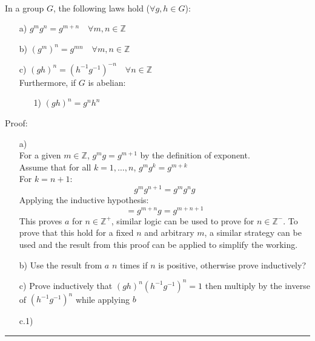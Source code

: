 \documentclass[11pt]{article}
\begin{document}
\begin{solution} \hfill \\
In a group $G$, the following laws hold ($\forall g,h\in G$):
\begin{itemize}
    \item[a)] $g^mg^n = g^{m+n} \quad \forall m,n\in \mathbb{Z}$
    \item[b)] $\left(g^m\right)^n = g^{mn} \quad \forall m,n\in \mathbb{Z}$
    \item[c)] $(gh)^n = \left(h^{-1}g^{-1}\right)^{-n} \quad \forall n\in \mathbb{Z}$\\
    Furthermore, if $G$ is abelian:
    \begin{itemize}
        \item[1)] $(gh)^n=g^nh^n$
    \end{itemize}
\end{itemize}
Proof:\\
\begin{itemize}
    \item[a)]\\
    For a given $m\in \mathbb{Z}$, $g^mg=g^{m+1}$ by the definition of exponent.\\
    Assume that for all $k=1,\dots,n$, $g^mg^k=g^{m+k}$\\
    For $k=n+1$:\\
    $$g^mg^{n+1}=g^mg^ng$$
    Applying the inductive hypothesis:
    $$=g^{m+n}g=g^{m+n+1}$$
    This proves $a$ for $n\in \mathbb{Z}^{+}$, similar logic can be used to prove for $n\in \mathbb{Z}^{-}$. To prove that this hold for a fixed $n$ and arbitrary $m$, a similar strategy can be used and the result from this proof can be applied to simplify the working.
    \item[b)]Use the result from $a$ $n$ times if $n$ is positive, otherwise prove inductively?
    \item[c)]Prove inductively that $(gh)^n(h^{-1}g^{-1})^n=1$ then multiply by the inverse of $(h^{-1}g^{-1})^n$ while applying $b$
    \item[c.1)]
\end{itemize}
\end{solution}
\vspace{6pt}
\hrule
\vspace{6pt}
\end{document}

